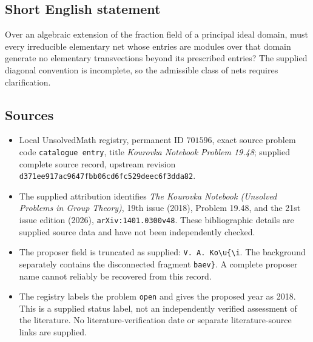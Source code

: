 \documentclass[11pt]{article}
\begin{document}
\subsection{Short English statement}
Over an algebraic extension of the fraction field of a principal ideal domain, must every irreducible elementary net whose entries are modules over that domain generate no elementary transvections beyond its prescribed entries? The supplied diagonal convention is incomplete, so the admissible class of nets requires clarification.
\subsection{Sources}
\begin{itemize}
\item Local UnsolvedMath registry, permanent ID \(701596\), exact source problem code \texttt{catalogue entry}, title \emph{Kourovka Notebook Problem 19.48}; supplied complete source record, upstream revision \texttt{d371ee917ac9647fbb06cd6fc529deec6f3dda82}.
\item The supplied attribution identifies \emph{The Kourovka Notebook (Unsolved Problems in Group Theory)}, 19th issue (2018), Problem 19.48, and the 21st issue edition (2026), \texttt{arXiv:1401.0300v48}. These bibliographic details are supplied source data and have not been independently checked.
\item The proposer field is truncated as supplied: \texttt{V. A. Ko\textbackslash u\{\textbackslash i}. The background separately contains the disconnected fragment \texttt{baev\}}. A complete proposer name cannot reliably be recovered from this record.
\item The registry labels the problem \texttt{open} and gives the proposed year as 2018. This is a supplied status label, not an independently verified assessment of the literature. No literature-verification date or separate literature-source links are supplied.
\end{itemize}
\end{document}
